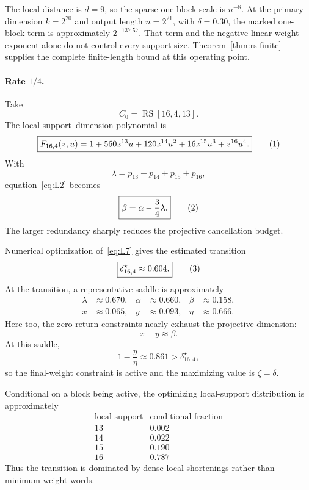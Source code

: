 The local distance is $d=9$, so the sparse one-block scale is $n^{-8}$.  At the
primary dimension $k=2^{20}$ and output length $n=2^{21}$, with $\delta=0.30$,
the marked one-block term is approximately $2^{-137.57}$.  That term and
the negative linear-weight exponent alone do not control every support
size.  Theorem~\ref{thm:rs-finite} supplies the complete finite-length bound
at this operating point.

\paragraph{Rate $1/4$.}

Take
\[
    C_0=\operatorname{RS}[16,4,13].
\]
The local support--dimension polynomial is
\[
    \boxed{
    F_{16,4}(z,u)
      =
    1+560z^{13}u+120z^{14}u^2+16z^{15}u^3+z^{16}u^4.
    }
    \eqnumlabel{eq:R3}
\]
With
\[
    \lambda=p_{13}+p_{14}+p_{15}+p_{16},
\]
equation~\eqref{eq:L2} becomes
\[
    \boxed{
    \beta=\alpha-\frac34\lambda.
    }
    \eqnumlabel{eq:R4}
\]
The larger redundancy sharply reduces the projective cancellation budget.

Numerical optimization of~\eqref{eq:L7} gives the estimated transition
\[
    \boxed{
    \delta^\star_{16,4}\approx0.604.
    }
    \eqnumlabel{eq:R5}
\]
At the transition, a representative saddle is approximately
\[
\begin{aligned}
    \lambda &\approx0.670, &
    \alpha &\approx0.660, &
    \beta &\approx0.158,\\
    x &\approx0.065, &
    y &\approx0.093, &
    \eta &\approx0.666.
\end{aligned}
\]
Here too, the zero-return constraints nearly exhaust the projective dimension:
\[
    \boxed{x+y\approx\beta.}
\]
At this saddle,
\[
    1-\frac{y}{\eta}\approx0.861>\delta^\star_{16,4},
\]
so the final-weight constraint is active and the maximizing value is
$\zeta=\delta$.

Conditional on a block being active, the optimizing local-support distribution
is approximately
\[
\begin{array}{c|c}
\text{local support} & \text{conditional fraction}\\
\hline
13 & 0.002\\
14 & 0.022\\
15 & 0.190\\
16 & 0.787
\end{array}
\]
Thus the transition is dominated by dense local shortenings rather than
minimum-weight words.

